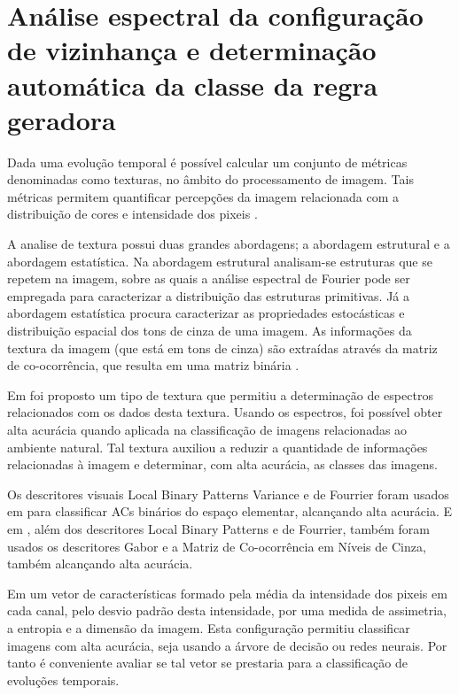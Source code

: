 \documentclass[12pt,a4paper]{report}
\begin{document}
	
	\chapter{Análise espectral da configuração de vizinhança e determinação automática da classe da regra geradora}
	\label{cap:neighborhoodSpectrumAnalises}
	
	Dada uma evolução temporal é possível calcular um conjunto de métricas denominadas como texturas, no âmbito do processamento de imagem. Tais métricas permitem quantificar percepções da imagem relacionada com a distribuição de cores e intensidade dos pixeis \cite{Stockman:2001}. 
	
	A analise de textura possui duas grandes abordagens; a abordagem estrutural e a abordagem estatística. Na abordagem estrutural analisam-se estruturas que se repetem na imagem, sobre as quais a análise espectral de Fourier pode ser empregada para caracterizar a distribuição das estruturas primitivas. Já a abordagem estatística procura caracterizar as propriedades estocásticas e distribuição espacial dos tons de cinza de uma imagem. As informações da textura da imagem (que está em tons de cinza) são extraídas através da matriz de co-ocorrência, que resulta em uma matriz binária \cite{DongAndLi1990}.
	
	Em  foi proposto um tipo de textura que permitiu a determinação de espectros relacionados com os dados desta textura. Usando os espectros, foi possível obter alta acurácia quando aplicada na classificação de imagens relacionadas ao ambiente natural. Tal textura auxiliou a reduzir a quantidade de informações relacionadas à imagem e determinar, com alta acurácia, as classes das imagens.
	
	Os descritores visuais Local Binary Patterns Variance e de Fourrier foram usados em  para classificar ACs binários do espaço elementar, alcançando alta acurácia. E em  , além dos descritores Local Binary Patterns e de Fourrier, também foram usados os descritores Gabor e a Matriz de Co-ocorrência em Níveis de Cinza, também alcançando alta acurácia.
	
	Em  um vetor de características formado pela média da intensidade dos pixeis em cada canal, pelo desvio padrão desta intensidade, por uma medida de assimetria, a entropia e a dimensão da imagem. Esta configuração permitiu classificar imagens com alta acurácia, seja usando a árvore de decisão ou redes neurais. Por tanto é conveniente avaliar se tal vetor se prestaria para a classificação de evoluções temporais.
	
\end{document}

